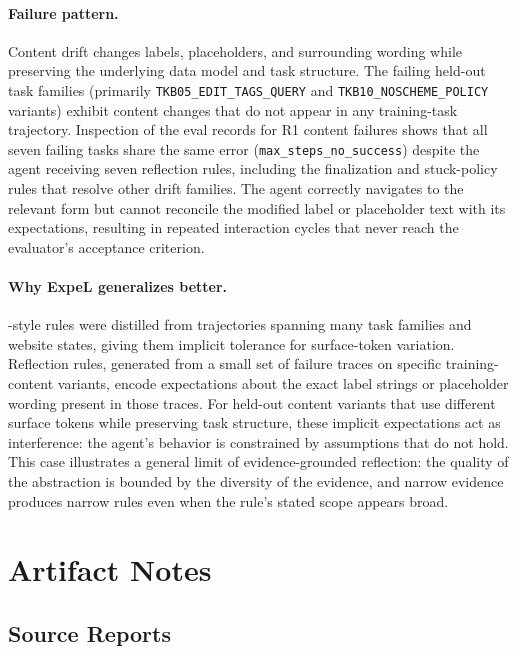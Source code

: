 \paragraph{Failure pattern.}
Content drift changes labels, placeholders, and surrounding wording while preserving the underlying data model and task structure. The failing held-out task families (primarily \texttt{TKB05\_EDIT\_TAGS\_QUERY} and \texttt{TKB10\_NOSCHEME\_POLICY} variants) exhibit content changes that do not appear in any training-task trajectory. Inspection of the eval records for R1 content failures shows that all seven failing tasks share the same error (\texttt{max\_steps\_no\_success}) despite the agent receiving seven reflection rules, including the finalization and stuck-policy rules that resolve other drift families. The agent correctly navigates to the relevant form but cannot reconcile the modified label or placeholder text with its expectations, resulting in repeated interaction cycles that never reach the evaluator's acceptance criterion.

\paragraph{Why ExpeL generalizes better.}
\expel{}-style rules were distilled from trajectories spanning many task families and website states, giving them implicit tolerance for surface-token variation. Reflection rules, generated from a small set of failure traces on specific training-content variants, encode expectations about the exact label strings or placeholder wording present in those traces. For held-out content variants that use different surface tokens while preserving task structure, these implicit expectations act as interference: the agent's behavior is constrained by assumptions that do not hold. This case illustrates a general limit of evidence-grounded reflection: the quality of the abstraction is bounded by the diversity of the evidence, and narrow evidence produces narrow rules even when the rule's stated scope appears broad.

\FloatBarrier

\section{Artifact Notes}

\subsection{Source Reports}

